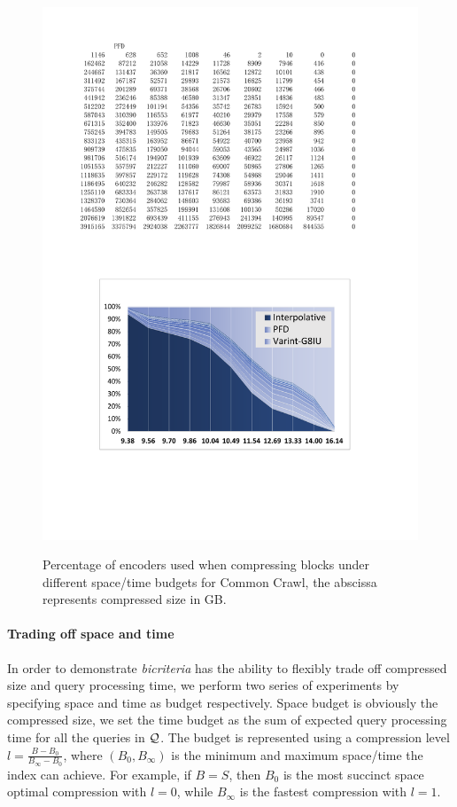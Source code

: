 \documentclass{sig-alternate-05-2015}
\begin{document}
\begin{figure}
{		\includegraphics[width=1.0\linewidth]{cc_T}
	}
	\caption{Percentage of encoders used when compressing blocks under different space/time budgets for Common Crawl, the abscissa represents compressed size in GB.}
	\label{fig: percentage}
\end{figure}
\paragraph*{Trading off space and time}
In order to demonstrate \textit{bicriteria} has the ability to flexibly trade off compressed size and query processing time, we perform two series of experiments by specifying space and time as budget respectively.
Space budget is obviously the compressed size, we set the time budget as the sum of expected query processing time for all the queries in $ \cal Q $.
The budget is represented using a compression level $ l = \frac{B-B_0}{B_\infty-B_0} $, where $ (B_0,B_\infty) $ is the minimum and maximum space/time the index can achieve.
For example, if $ B = S $, then $ B_0 $ is the most succinct space optimal compression with $ l = 0 $, while $ B_\infty $ is the fastest compression with $ l = 1 $.
\end{document}
